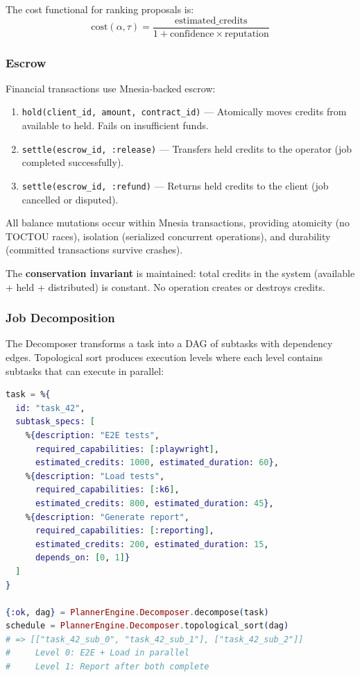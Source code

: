 \documentclass[12pt,a4paper]{article}
\theoremstyle{definition}
\begin{document}
The cost functional for ranking proposals is:
\begin{equation}\label{eq:cost-functional}
  \text{cost}(\alpha, \tau) = \frac{\text{estimated\_credits}}
                                    {1 + \text{confidence} \times \text{reputation}}
\end{equation}

\subsubsection{Escrow}

Financial transactions use Mnesia-backed escrow:

\begin{enumerate}
  \item \texttt{hold(client\_id, amount, contract\_id)} --- Atomically moves
        credits from available to held. Fails on insufficient funds.
  \item \texttt{settle(escrow\_id, :release)} --- Transfers held credits to
        the operator (job completed successfully).
  \item \texttt{settle(escrow\_id, :refund)} --- Returns held credits to the
        client (job cancelled or disputed).
\end{enumerate}

All balance mutations occur within Mnesia transactions, providing atomicity
(no TOCTOU races), isolation (serialized concurrent operations), and durability
(committed transactions survive crashes).

The \textbf{conservation invariant} is maintained: total credits in the system
(available + held + distributed) is constant. No operation creates or destroys credits.

\subsubsection{Job Decomposition}

The Decomposer transforms a task into a DAG of subtasks with dependency edges.
Topological sort produces execution levels where each level contains subtasks
that can execute in parallel:

\begin{lstlisting}[language=elixir, caption={Parallel execution schedule from DAG decomposition}]
task = %{
  id: "task_42",
  subtask_specs: [
    %{description: "E2E tests",
      required_capabilities: [:playwright],
      estimated_credits: 1000, estimated_duration: 60},
    %{description: "Load tests",
      required_capabilities: [:k6],
      estimated_credits: 800, estimated_duration: 45},
    %{description: "Generate report",
      required_capabilities: [:reporting],
      estimated_credits: 200, estimated_duration: 15,
      depends_on: [0, 1]}
  ]
}

{:ok, dag} = PlannerEngine.Decomposer.decompose(task)
schedule = PlannerEngine.Decomposer.topological_sort(dag)
# => [["task_42_sub_0", "task_42_sub_1"], ["task_42_sub_2"]]
#     Level 0: E2E + Load in parallel
#     Level 1: Report after both complete
\end{lstlisting}
\end{document}
